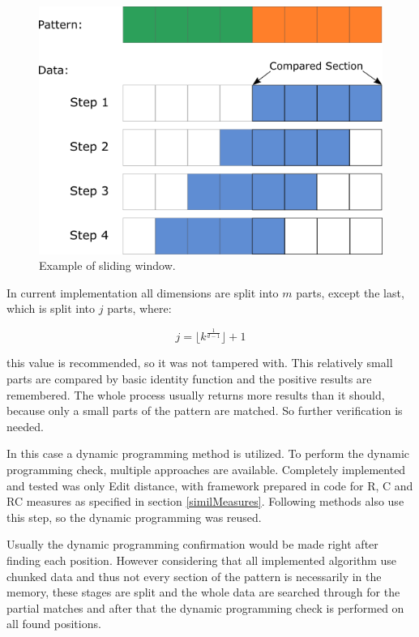 \begin{figure}
\centering
\includegraphics[width=\textwidth]{slide}
\caption{Example of sliding window.}
\label{fig_slide}
\end{figure}

In current implementation all dimensions are split into $m$ parts, except the last, which is split into $j$ parts, where:

$$j = \lfloor k^{\frac{1}{d-1}} \rfloor + 1$$

this value is recommended, so it was not tampered with. This relatively small parts are compared by basic identity function and the positive results are remembered. The whole process usually returns more results than it should, because only a small parts of the pattern are matched. So further verification is needed.

In this case a dynamic programming method is utilized. To perform the dynamic programming check, multiple approaches are available. Completely implemented and tested was only Edit distance, with framework prepared in code for R, C and RC measures as specified in section \ref{similMeasures}. Following methods also use this step, so the dynamic programming was reused.

Usually the dynamic programming confirmation would be made right after finding each position. However considering that all implemented algorithm use chunked data and thus not every section of the pattern is necessarily in the memory, these stages are split and the whole data are searched through for the partial matches and after that the dynamic programming check is performed on all found positions.

